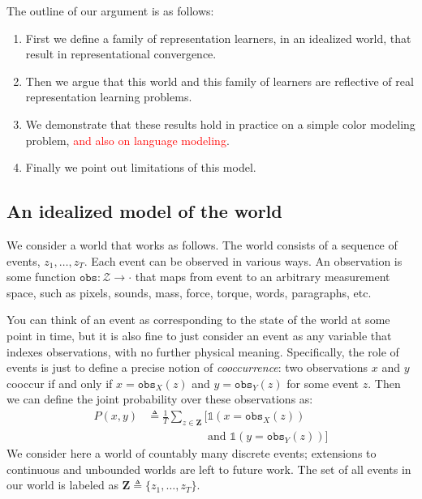 The outline of our argument is as follows:
\begin{enumerate}
    \item First we define a family of representation learners, in an idealized world, that result in representational convergence.
    \item Then we argue that this world and this family of learners are reflective of real representation learning problems.
    \item We demonstrate that these results hold in practice on a simple color modeling problem, \textcolor{red}{and also on language modeling}.
    \item Finally we point out limitations of this model.
\end{enumerate}

\subsection{An idealized model of the world}
We consider a world that works as follows. The world consists of a sequence of events, $z_1, \ldots, z_T$. Each event can be observed in various ways. An observation is some function $\texttt{obs}: \mathcal{Z} \rightarrow \cdot$ that maps from event to an arbitrary measurement space, such as pixels, sounds, mass, force, torque, words, paragraphs, etc.

You can think of an event as corresponding to the state of the world at some point in time, but it is also fine to just consider an event as any variable that indexes observations, with no further physical meaning. Specifically, the role of events is just to define a precise notion of \textit{cooccurrence}: two observations $x$ and $y$ cooccur if and only if $x = \texttt{obs}_X(z)$ and $y = \texttt{obs}_Y(z)$ for some event $z$. Then we can define the joint probability over these observations as:
\begin{align}
    P(x,y) %
           &\triangleq \frac{1}{T} \sum_{z \in \mathbf{Z}} [\mathds{1}(x = \texttt{obs}_X(z)) \\ & \quad\quad\quad\quad\quad\text{ and } \mathds{1}(y = \texttt{obs}_Y(z))]
\end{align}
We consider here a world of countably many discrete events; extensions to continuous and unbounded worlds are left to future work. The set of all events in our world is labeled as $\mathbf{Z} \triangleq \{z_1, \ldots, z_T\}$.

